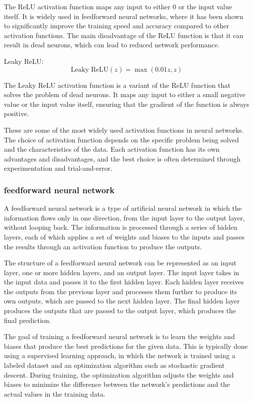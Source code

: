 \documentclass[12pt, a4paper, oneside]{article}
\begin{document}
The ReLU activation function maps any input to either 0 or the input value itself. It is widely used in feedforward neural networks, where it has been shown to significantly improve the training speed and accuracy compared to other activation functions. The main disadvantage of the ReLU function is that it can result in dead neurons, which can lead to reduced network performance.

Leaky ReLU:
$$ \text{Leaky ReLU}(z) = \max(0.01z, z) $$

The Leaky ReLU activation function is a variant of the ReLU function that solves the problem of dead neurons. It maps any input to either a small negative value or the input value itself, ensuring that the gradient of the function is always positive.

These are some of the most widely used activation functions in neural networks. The choice of activation function depends on the specific problem being solved and the characteristics of the data. Each activation function has its own advantages and disadvantages, and the best choice is often determined through experimentation and trial-and-error.
\subsubsection{feedforward neural network }
A feedforward neural network is a type of artificial neural network in which the information flows only in one direction, from the input layer to the output layer, without looping back. The information is processed through a series of hidden layers, each of which applies a set of weights and biases to the inputs and passes the results through an activation function to produce the outputs.

The structure of a feedforward neural network can be represented as an input layer, one or more hidden layers, and an output layer. The input layer takes in the input data and passes it to the first hidden layer. Each hidden layer receives the outputs from the previous layer and processes them further to produce its own outputs, which are passed to the next hidden layer. The final hidden layer produces the outputs that are passed to the output layer, which produces the final prediction.

The goal of training a feedforward neural network is to learn the weights and biases that produce the best predictions for the given data. This is typically done using a supervised learning approach, in which the network is trained using a labeled dataset and an optimization algorithm such as stochastic gradient descent. During training, the optimization algorithm adjusts the weights and biases to minimize the difference between the network's predictions and the actual values in the training data.
\end{document}
